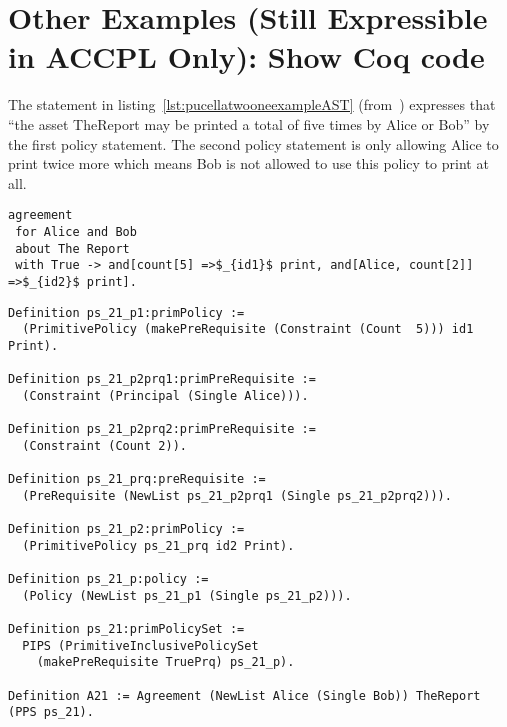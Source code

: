 


\section{Other Examples (Still Expressible in ACCPL Only): Show Coq code}

The statement in listing~\ref{lst:pucellatwooneexampleAST} (from~\cite{pucella2006}) expresses that ``the asset TheReport may be printed a total of five times by Alice or Bob'' by the first policy statement. The second policy statement is only allowing Alice to print twice more which means Bob is not allowed to use this policy to print at all.

\lstset{language=Pucella2006}
\begin{minipage}[c]{0.95\textwidth}
\begin{lstlisting}[frame=single, caption={Agreement of Example 2.1}, label={lst:pucellatwooneexampleAST}, mathescape]
agreement
 for Alice and Bob 
 about The Report 
 with True -> and[count[5] =>$_{id1}$ print, and[Alice, count[2]] =>$_{id2}$ print].
\end{lstlisting}
\end{minipage} 

\begin{minipage}[c]{0.95\textwidth}
\begin{lstlisting}
Definition ps_21_p1:primPolicy := 
  (PrimitivePolicy (makePreRequisite (Constraint (Count  5))) id1 Print).

Definition ps_21_p2prq1:primPreRequisite := 
  (Constraint (Principal (Single Alice))).

Definition ps_21_p2prq2:primPreRequisite := 
  (Constraint (Count 2)).

Definition ps_21_prq:preRequisite := 
  (PreRequisite (NewList ps_21_p2prq1 (Single ps_21_p2prq2))).

Definition ps_21_p2:primPolicy := 
  (PrimitivePolicy ps_21_prq id2 Print).

Definition ps_21_p:policy := 
  (Policy (NewList ps_21_p1 (Single ps_21_p2))).

Definition ps_21:primPolicySet :=
  PIPS (PrimitiveInclusivePolicySet
    (makePreRequisite TruePrq) ps_21_p).

Definition A21 := Agreement (NewList Alice (Single Bob)) TheReport (PPS ps_21).
\end{lstlisting}
\end{minipage} 

